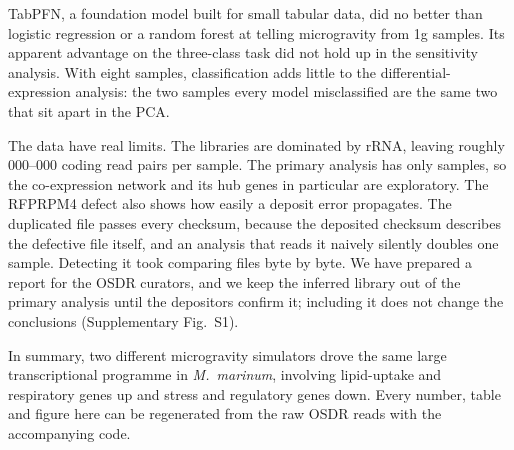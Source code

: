 TabPFN, a foundation model built for small tabular data\cite{hollmann2025accurate}, did no better than logistic regression or a random forest at telling microgravity from 1g samples. Its apparent advantage on the three-class task did not hold up in the sensitivity analysis. With eight samples, classification adds little to the differential-expression analysis: the two samples every model misclassified are the same two that sit apart in the PCA.

The data have real limits. The libraries are dominated by rRNA, leaving roughly \cdsPairsPrimaryMinK{}{,}000--\cdsPairsPrimaryMaxK{}{,}000 coding read pairs per sample. The primary analysis has only \nPrimary{} samples, so the co-expression network and its hub genes in particular are exploratory. The RFPRPM4 defect also shows how easily a deposit error propagates. The duplicated file passes every checksum, because the deposited checksum describes the defective file itself, and an analysis that reads it naively silently doubles one sample. Detecting it took comparing files byte by byte. We have prepared a report for the OSDR curators, and we keep the inferred library out of the primary analysis until the depositors confirm it; including it does not change the conclusions (Supplementary Fig.~S1).

In summary, two different microgravity simulators drove the same large transcriptional programme in \textit{M.~marinum}, involving lipid-uptake and respiratory genes up and stress and regulatory genes down. Every number, table and figure here can be regenerated from the raw OSDR reads with the accompanying code.
